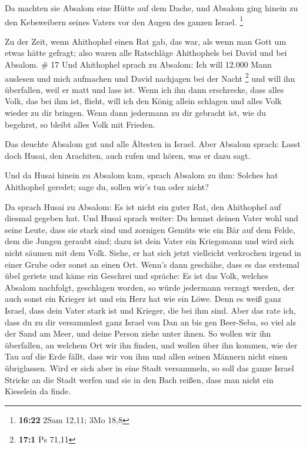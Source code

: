  Da machten sie Absalom eine Hütte auf dem Dache, und
Absalom ging hinein zu den Kebsweibern seines Vaters vor den Augen des
ganzen Israel. \footnote{\textbf{16:22} 2Sam 12,11; 3Mo 18,8}

 Zu der Zeit, wenn Ahithophel einen Rat gab, das war, als
wenn man Gott um etwas hätte gefragt; also waren alle Ratschläge
Ahithophels bei David und bei Absalom. \# 17  Und Ahithophel
sprach zu Absalom: Ich will 12.000 Mann auslesen und mich aufmachen und
David nachjagen bei der Nacht \footnote{\textbf{17:1} Ps 71,11}
 und will ihn überfallen, weil er matt und lass ist. Wenn
ich ihn dann erschrecke, dass alles Volk, das bei ihm ist, flieht, will
ich den König allein schlagen  und alles Volk wieder zu dir
bringen. Wenn dann jedermann zu dir gebracht ist, wie du begehrst, so
bleibt alles Volk mit Frieden.

 Das deuchte Absalom gut und alle Ältesten in Israel.
 Aber Absalom sprach: Lasst doch Husai, den Arachiten, auch
rufen und hören, was er dazu sagt.

 Und da Husai hinein zu Absalom kam, sprach Absalom zu ihm:
Solches hat Ahithophel geredet; sage du, sollen wir's tun oder nicht?

 Da sprach Husai zu Absalom: Es ist nicht ein guter Rat, den
Ahithophel auf diesmal gegeben hat.  Und Husai sprach
weiter: Du kennst deinen Vater wohl und seine Leute, dass sie stark sind
und zornigen Gemüts wie ein Bär auf dem Felde, dem die Jungen geraubt
sind; dazu ist dein Vater ein Kriegsmann und wird sich nicht säumen mit
dem Volk.  Siehe, er hat sich jetzt vielleicht verkrochen
irgend in einer Grube oder sonst an einen Ort. Wenn's dann geschähe,
dass es das erstemal übel geriete und käme ein Geschrei und spräche: Es
ist das Volk, welches Absalom nachfolgt, geschlagen worden,
 so würde jedermann verzagt werden, der auch sonst ein
Krieger ist und ein Herz hat wie ein Löwe. Denn es weiß ganz Israel,
dass dein Vater stark ist und Krieger, die bei ihm sind. 
Aber das rate ich, dass du zu dir versammlest ganz Israel von Dan an bis
gen Beer-Seba, so viel als der Sand am Meer, und deine Person ziehe
unter ihnen.  So wollen wir ihn überfallen, an welchem Ort
wir ihn finden, und wollen über ihn kommen, wie der Tau auf die Erde
fällt, dass wir von ihm und allen seinen Männern nicht einen
übriglassen.  Wird er sich aber in eine Stadt versammeln,
so soll das ganze Israel Stricke an die Stadt werfen und sie in den Bach
reißen, dass man nicht ein Kieselein da finde.

